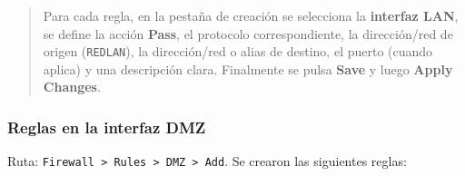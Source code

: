 \documentclass{article}
\renewcommand{\_}{\oldunderscore\hskip0pt\relax}
\begin{document}
\begin{quote}
Para cada regla, en la pestaña de creación se selecciona la
\textbf{interfaz LAN}, se define la acción \textbf{Pass}, el protocolo
correspondiente, la dirección/red de origen (\texttt{RED\_LAN}), la
dirección/red o alias de destino, el puerto (cuando aplica) y una
descripción clara. Finalmente se pulsa \textbf{Save} y luego
\textbf{Apply Changes}.
\end{quote}

\hypertarget{reglas-en-la-interfaz-dmz}{%
\subsubsection{Reglas en la interfaz
DMZ}\label{reglas-en-la-interfaz-dmz}}

Ruta:
\texttt{Firewall\ \textgreater{}\ Rules\ \textgreater{}\ DMZ\ \textgreater{}\ Add}.
Se crearon las siguientes reglas:
\end{document}
